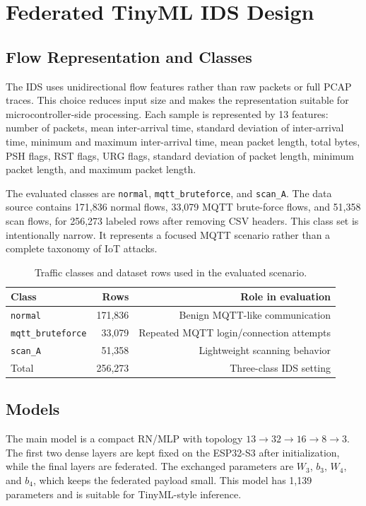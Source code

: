 \documentclass[runningheads]{llncs}
\begin{document}
\section{Federated TinyML IDS Design}

\subsection{Flow Representation and Classes}

The IDS uses unidirectional flow features rather than raw packets or full PCAP traces. This choice reduces input size and makes the representation suitable for microcontroller-side processing. Each sample is represented by 13 features: number of packets, mean inter-arrival time, standard deviation of inter-arrival time, minimum and maximum inter-arrival time, mean packet length, total bytes, PSH flags, RST flags, URG flags, standard deviation of packet length, minimum packet length, and maximum packet length.

The evaluated classes are \texttt{normal}, \texttt{mqtt\_bruteforce}, and \texttt{scan\_A}. The data source contains 171,836 normal flows, 33,079 MQTT brute-force flows, and 51,358 scan flows, for 256,273 labeled rows after removing CSV headers. This class set is intentionally narrow. It represents a focused MQTT scenario rather than a complete taxonomy of IoT attacks.

\begin{table}[t]
\centering
\caption{Traffic classes and dataset rows used in the evaluated scenario.}
\label{tab:dataset}
\begin{tabular}{lrr}
\toprule
Class & Rows & Role in evaluation \\
\midrule
\texttt{normal} & 171,836 & Benign MQTT-like communication \\
\texttt{mqtt\_bruteforce} & 33,079 & Repeated MQTT login/connection attempts \\
\texttt{scan\_A} & 51,358 & Lightweight scanning behavior \\
\midrule
Total & 256,273 & Three-class IDS setting \\
\bottomrule
\end{tabular}
\end{table}

\subsection{Models}

The main model is a compact RN/MLP with topology $13 \rightarrow 32 \rightarrow 16 \rightarrow 8 \rightarrow 3$. The first two dense layers are kept fixed on the ESP32-S3 after initialization, while the final layers are federated. The exchanged parameters are $W_3$, $b_3$, $W_4$, and $b_4$, which keeps the federated payload small. This model has 1,139 parameters and is suitable for TinyML-style inference.
\end{document}
